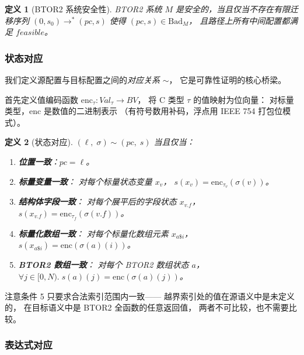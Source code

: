 \documentclass[11pt,a4paper]{article}
\newtheorem{definition}{定义}[section]
\begin{document}
\begin{definition}[BTOR2 系统安全性]
\label{def:target-safety}
BTOR2 系统 $M$ 是\emph{安全的}，当且仅当不存在有限迁移序列
$(0, s_0) \to^* (\mathit{pc}, s)$ 使得 $(\mathit{pc}, s) \in \mathrm{Bad}_M$，
且路径上所有中间配置都满足 $\mathit{feasible}$。
\end{definition}

\subsubsection{状态对应}
\label{sec:correspondence}

我们定义源配置与目标配置之间的\emph{对应关系} $\sim$，
它是可靠性证明的核心桥梁。

首先定义值编码函数 $\mathrm{enc}_\tau : \mathit{Val}_\tau \to \mathit{BV}$，
将 C 类型 $\tau$ 的值映射为位向量：
对标量类型，$\mathrm{enc}$ 是数值的二进制表示
（有符号数用补码，浮点用 IEEE 754 打包位模式）。

\begin{definition}[状态对应]
\label{def:correspondence}
$(\ell,\; \sigma) \sim (\mathit{pc},\; s)$ 当且仅当：
\begin{enumerate}
\item \textbf{位置一致}：$\mathit{pc} = \ell$。

\item \textbf{标量变量一致}：
  对每个标量状态变量 $x_v$，
  $s(x_v) = \mathrm{enc}_{\tau_v}(\sigma(v))$。

\item \textbf{结构体字段一致}：
  对每个展平后的字段状态 $x_{v.f}$，
  $s(x_{v.f}) = \mathrm{enc}_{\tau_f}(\sigma(v.f))$。

\item \textbf{标量化数组一致}：
  对每个标量化数组元素 $x_{a\$i}$，
  $s(x_{a\$i}) = \mathrm{enc}(\sigma(a)(i))$。

\item \textbf{BTOR2 数组一致}：
  对每个 BTOR2 数组状态 $a$，
  $\forall j \in [0, N).\;
  s(a)(j) = \mathrm{enc}(\sigma(a)(j))$。
\end{enumerate}
\end{definition}

注意条件 5 只要求合法索引范围内一致——
越界索引处的值在源语义中是未定义的，
在目标语义中是 BTOR2 全函数的任意返回值，
两者不可比较，也不需要比较。

\subsubsection{表达式对应}
\label{sec:expr-correspondence}
\end{document}
